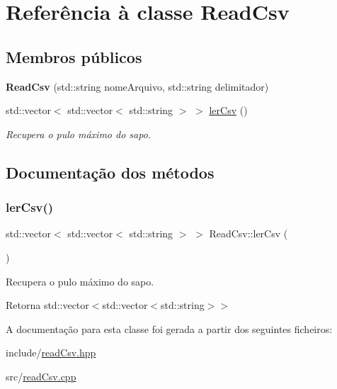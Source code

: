 \hypertarget{classReadCsv}{}\section{Referência à classe Read\+Csv}
\label{classReadCsv}
\subsection*{Membros públicos}
\begin{DoxyCompactItemize}
\item 
\mbox{\label{classReadCsv_af6d00a8833e6fd4996eb7d061f0f1fcf}} 
{\bfseries Read\+Csv} (std\+::string nome\+Arquivo, std\+::string delimitador)
\item 
std\+::vector$<$ std\+::vector$<$ std\+::string $>$ $>$ \hyperlink{classReadCsv_a15d5143be99ff85bcf997617d0650f1c}{ler\+Csv} ()
\begin{DoxyCompactList}\small\item\em Recupera o pulo máximo do sapo. \end{DoxyCompactList}\end{DoxyCompactItemize}


\subsection{Documentação dos métodos}
\mbox{\label{classReadCsv_a15d5143be99ff85bcf997617d0650f1c}} 
\subsubsection{\texorpdfstring{ler\+Csv()}{lerCsv()}}
{\footnotesize\ttfamily std\+::vector$<$ std\+::vector$<$ std\+::string $>$ $>$ Read\+Csv\+::ler\+Csv (\begin{DoxyParamCaption}{ }\end{DoxyParamCaption})}



Recupera o pulo máximo do sapo. 

\begin{DoxyReturn}{Retorna}
std\+::vector$<$std\+::vector$<$std\+::string$>$$>$ 
\end{DoxyReturn}


A documentação para esta classe foi gerada a partir dos seguintes ficheiros\+:\begin{DoxyCompactItemize}
\item 
include/\hyperlink{readCsv_8hpp}{read\+Csv.\+hpp}\item 
src/\hyperlink{readCsv_8cpp}{read\+Csv.\+cpp}\end{DoxyCompactItemize}
